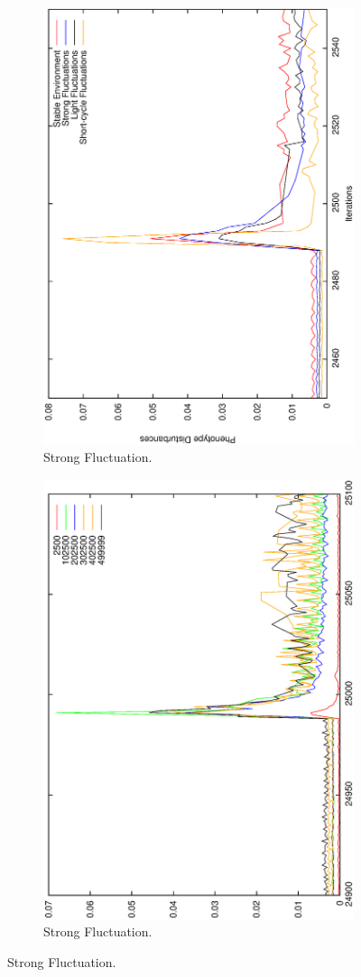 \begin{figure}[H]
\begin{subfigure}{.25\textwidth}
  \centering
  \includegraphics[width=.7\linewidth, angle =-90]{img/Failavg499999variationb.eps}
  \caption{Strong Fluctuation.}
  \label{fig:transst}
\end{subfigure}%
\begin{subfigure}{.25\textwidth}
  \centering
  \includegraphics[width=.7\linewidth, angle =-90]{img/avgvarValidvariationb.eps}
  \caption{Strong Fluctuation.}
  \label{fig:transli}
\end{subfigure}


\end{figure}
